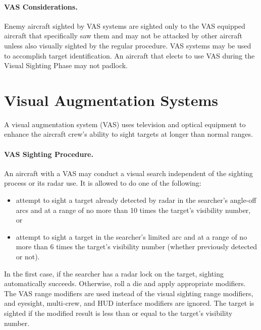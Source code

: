 \begin{advancedrules}
{\paragraph{VAS Considerations.} Enemy aircraft sighted by VAS systems are sighted only to the VAS equipped aircraft that specifically saw them and may not be attacked by other aircraft unless also visually sighted by the regular procedure. VAS systems may be used to accomplish target identification. An aircraft that elects to use VAS during the Visual Sighting Phase may not padlock.

}{

\section{Visual Augmentation Systems}
\label{rule:vas}

A visual augmentation system (VAS) uses television and optical equipment to enhance the aircraft crew’s ability to sight targets at longer than normal ranges.


\paragraph{VAS Sighting Procedure.} An aircraft with a VAS may conduct a visual search independent of the sighting process or its radar use. It is allowed to do one of the following:

\begin{itemize}

    \item attempt to sight a target already detected by radar in the searcher’s  angle-off arcs and at a range of no more than 10 times the target’s visibility number, or

    \item attempt to sight a target in the searcher’s limited arc and at a range of no more than 6 times the target’s visibility number (whether previously detected or not).

\end{itemize}

In the first case, if the searcher has a radar lock on the target, sighting automatically succeeds. Otherwise, roll a die and apply appropriate modifiers. The VAS range modifiers are used instead of the visual sighting range modifiers, and eyesight, multi-crew, and HUD interface modifiers are ignored. The target is sighted if the modified result is less than or equal to the target’s visibility number.

}
\end{advancedrules}
